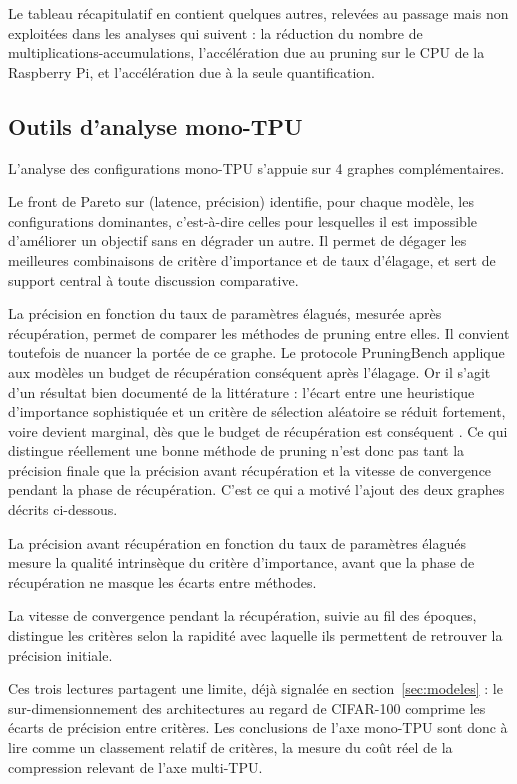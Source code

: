 \documentclass[11pt,a4paper]{report}
\begin{document}
Le tableau récapitulatif en contient quelques autres, relevées au passage mais non exploitées dans les analyses qui suivent : la réduction du nombre de multiplications-accumulations, l'accélération due au pruning sur le CPU de la Raspberry Pi, et l'accélération due à la seule quantification.

\subsection{Outils d'analyse mono-TPU}

L'analyse des configurations mono-TPU s'appuie sur 4 graphes complémentaires.

Le front de Pareto sur (latence, précision) identifie, pour chaque modèle, les configurations dominantes, c'est-à-dire celles pour lesquelles il est impossible d'améliorer un objectif sans en dégrader un autre. Il permet de dégager les meilleures combinaisons de critère d'importance et de taux d'élagage, et sert de support central à toute discussion comparative.

La précision en fonction du taux de paramètres élagués, mesurée après récupération, permet de comparer les méthodes de pruning entre elles. Il convient toutefois de nuancer la portée de ce graphe. Le protocole PruningBench applique aux modèles un budget de récupération conséquent après l'élagage. Or il s'agit d'un résultat bien documenté de la littérature : l'écart entre une heuristique d'importance sophistiquée et un critère de sélection aléatoire se réduit fortement, voire devient marginal, dès que le budget de récupération est conséquent \cite{liuRethinkingValueNetwork2019}. Ce qui distingue réellement une bonne méthode de pruning n'est donc pas tant la précision finale que la précision avant récupération et la vitesse de convergence pendant la phase de récupération. C'est ce qui a motivé l'ajout des deux graphes décrits ci-dessous.

La précision avant récupération en fonction du taux de paramètres élagués mesure la qualité intrinsèque du critère d'importance, avant que la phase de récupération ne masque les écarts entre méthodes.

La vitesse de convergence pendant la récupération, suivie au fil des époques, distingue les critères selon la rapidité avec laquelle ils permettent de retrouver la précision initiale.

Ces trois lectures partagent une limite, déjà signalée en section~\ref{sec:modeles} : le sur-dimensionnement des architectures au regard de CIFAR-100 comprime les écarts de précision entre critères. Les conclusions de l'axe mono-TPU sont donc à lire comme un classement relatif de critères, la mesure du coût réel de la compression relevant de l'axe multi-TPU.
\end{document}
